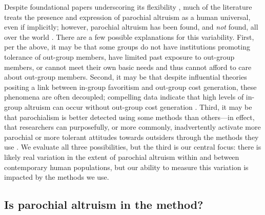 \documentclass[bibauthoryear]{aa}
\begin{document}
Despite foundational papers underscoring its flexibility \citep{bowles2003origins, bowles2004persistent, choi2007coevolution}, much of the literature treats the presence and expression of parochial altruism as a human universal, even if implicitly; however, parochial altruism has been found, and \emph{not} found, all over the world \citep{Rusch2014, Baldassarri1183}. There are a few possible explanations for this variability. First, per the above, it may be that some groups do not have institutions promoting tolerance of out-group members, have limited past exposure to out-group members, or cannot meet their own basic needs and thus cannot afford to care about out-group members. Second, it may be that despite influential theories positing a link between in-group favoritism and out-group cost generation, these phenomena are often decoupled; compelling data indicate that high levels of in-group altruism can occur without out-group cost generation \citep{purzycki2019identity, hruschka2013economic, yamagishi2016parochial, brewer2006evolutionary, schaub2017threat, cashdan2001ethnocentrism, Rusch2014, de2014parochial}. %
 Third, it may be that parochialism is better detected using some methods than others---in effect, that researchers can purposefully, or more commonly, inadvertently activate more parochial or more tolerant attitudes towards outsiders through the methods they use \citep{Pisor2020}. We evaluate all three possibilities, but the third is our central focus: there is likely real variation in the extent of parochial altruism within and between contemporary human populations, but our ability to measure this variation is impacted by the methods we use.

\subsection{Is parochial altruism in the method?}\label{inthemethod}
\end{document}
